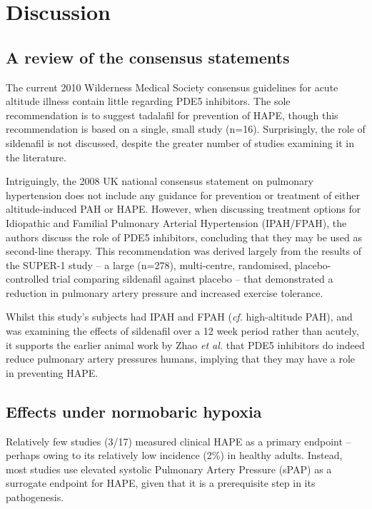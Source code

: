 \documentclass[12pt,a4paper]{article}
\begin{document}
\section*{Discussion}

\subsection*{A review of the consensus statements}

The current 2010 Wilderness Medical Society consensus guidelines for acute altitude illness contain little regarding PDE5 inhibitors.\cite{Luks:2010ht} The sole recommendation is to suggest tadalafil for prevention of HAPE, though this recommendation is based on a single, small study (n=16).\cite{Maggiorini:2006kz} Surprisingly, the role of sildenafil is not discussed, despite the greater number of studies examining it in the literature.

Intriguingly, the 2008 UK national consensus statement on pulmonary hypertension does not include any guidance for prevention or treatment of either altitude-induced PAH or HAPE.\cite{NationalPulmonaryHypertensionCentresoftheUKandIreland:2008jh} However, when discussing treatment options for Idiopathic and Familial Pulmonary Arterial Hypertension (IPAH/FPAH), the authors discuss the role of PDE5 inhibitors, concluding that they may be used as second-line therapy. This recommendation was derived largely from the results of the SUPER-1 study -- a large (n=278), multi-centre, randomised, placebo-controlled trial comparing sildenafil against placebo -- that demonstrated a reduction in pulmonary artery pressure and increased exercise tolerance.\cite{Galie:2005gx}

Whilst this study's subjects had IPAH and FPAH (\emph{cf.} high-altitude PAH), and was examining the effects of sildenafil over a 12 week period rather than acutely, it supports the earlier animal work by Zhao \emph{et al.}\cite{Zhao:2001kj} that PDE5 inhibitors do indeed reduce pulmonary artery pressures humans, implying that they may have a role in preventing HAPE.

\subsection*{Effects under normobaric hypoxia}

Relatively few studies (3/17) measured clinical HAPE as a primary endpoint -- perhaps owing to its relatively low incidence (2\%) in healthy adults\cite{Bartsch:2002cg}. Instead, most studies use elevated systolic Pulmonary Artery Pressure (sPAP) as a surrogate endpoint for HAPE, given that it is a prerequisite step in its pathogenesis.\cite{Maggiorini:2001vq}
\end{document}
